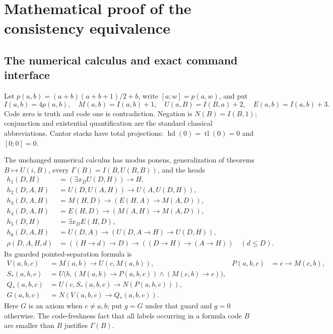 \section{Mathematical proof of the consistency equivalence}
\label{sec:math}

\subsection{The numerical calculus and exact command interface}

Let $p(a,b)=(a+b)(a+b+1)/2+b$, write $[a;w]=p(a,w)$, and put
\[
 I(a,b)=4p(a,b),\quad M(a,b)=I(a,b)+1,\quad
 U(a,B)=I(B,a)+2,\quad E(a,b)=I(a,b)+3.
\]
Code zero is truth and code one is contradiction. Negation is
$N(B)=I(B,1)$; conjunction and existential quantification are the standard
classical abbreviations. Cantor stacks have total projections:
$\operatorname{hd}(0)=\operatorname{tl}(0)=0$ and $[0;0]=0$.

The unchanged numerical calculus has modus ponens, generalization of
theorems $B\mapsto U(i,B)$, every $\Gamma(B)=I(B,U(B,B))$, and the heads
\begin{align*}
 h_1(D,H)&=(\exists x_D U(D,H))\to H,\\
 h_2(D,A,H)&=U(D,U(A,H))\to U(A,U(D,H)),\\
 h_3(D,A,H)&=M(H,D)\to(E(H,A)\to M(A,D)),\\
 h_4(D,A,H)&=E(H,D)\to(M(A,H)\to M(A,D)),\\
 h_5(D,H)&=\exists x_D E(H,D),\\
 h_6(D,A,H)&=U(D,A)\to(U(D,A\to H)\to U(D,H)),\\
 \rho(D,A,H,d)&=((H\to d)\to D)\to((D\to H)\to(A\to H))\quad(d\le D).
\end{align*}
Its guarded pointed-separation formula is
\begin{align*}
 V(a,b,c)&=M(a,b)\to U(c,M(a,b)),&P(a,b,c)&=c\to M(c,b),\\
 S_*(a,b,c)&=U\bigl(b,(M(a,b)\to P(a,b,c))\wedge(M(c,b)\to c)\bigr),\\
 Q_*(a,b,c)&=U(c,S_*(a,b,c)\to N(P(a,b,c))),\\
 G(a,b,c)&=N(V(a,b,c)\to Q_*(a,b,c)).
\end{align*}
Here $G$ is an axiom when $c\ne a,b$; put $g=G$ under that guard and
$g=0$ otherwise. The code-freshness fact that all labels occurring in a
formula code $B$ are smaller than $B$ justifies $\Gamma(B)$.

